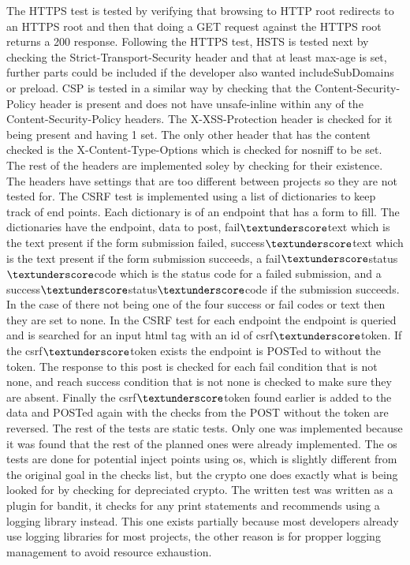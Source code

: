 The HTTPS test is tested by verifying that browsing to HTTP root redirects to an HTTPS root and then that doing a GET request against the HTTPS root returns a 200 response. Following the HTTPS test,
HSTS is tested next by checking the Strict-Transport-Security header and that at least max-age is set, further parts could be included if the developer also wanted includeSubDomains or preload. CSP
is tested in a similar way by checking that the Content-Security-Policy header is present and does not have unsafe-inline within any of the Content-Security-Policy headers. The X-XSS-Protection header
is checked for it being present and having 1 set. The only other header that has the content checked is the X-Content-Type-Options which is checked for nosniff to be set. The rest of the headers
are implemented soley by checking for their existence. The headers have settings that are too different between projects so they are not tested for. The CSRF test is implemented using a list of
dictionaries to keep track of end points. Each dictionary is of an endpoint that has a form to fill. The dictionaries have the endpoint, data to post, fail$\textunderscore$text which is the text
present if the form submission failed, success$\textunderscore$text which is the text present if the form submission succeeds, a fail$\textunderscore$status$\textunderscore$code which is the status
code for a failed submission, and a success$\textunderscore$status$\textunderscore$code if the submission succeeds. In the case of there not being one of the four success or fail codes or text then
they are set to none. In the CSRF test for each endpoint the endpoint is queried and is searched for an input html tag with an id of csrf$\textunderscore$token. If the csrf$\textunderscore$token
exists the endpoint is POSTed to without the token. The response to this post is checked for each fail condition that is not none, and reach success condition that is not none is checked to make sure
they are absent. Finally the csrf$\textunderscore$token found earlier is added to the data and POSTed again with the checks from the POST without the token are reversed. The rest of the tests are
static tests. Only one was implemented because it was found that the rest of the planned ones were already implemented. The os tests are done for potential inject points using os, which is slightly
different from the original goal in the checks list, but the crypto one does exactly what is being looked for by checking for depreciated crypto. The written test was written as a plugin for bandit,
it checks for any print statements and recommends using a logging library instead. This one exists partially because most developers already use logging libraries for most projects, the other reason
is for propper logging management to avoid resource exhaustion.

